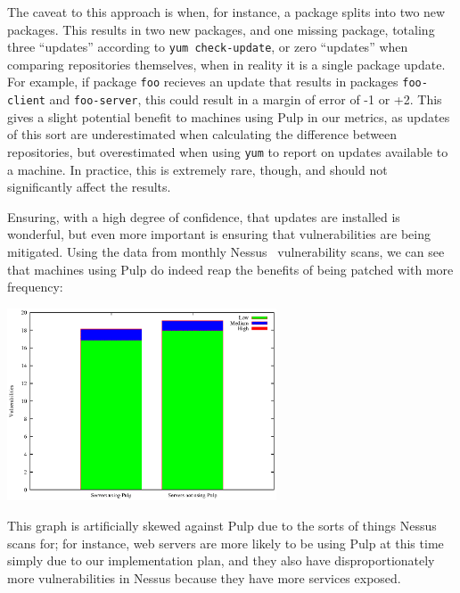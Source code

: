The caveat to this approach is when, for instance, a package splits
into two new packages. This results in two new packages, and one
missing package, totaling three ``updates'' according to \texttt{yum
  check-update}, or zero ``updates'' when comparing repositories
themselves, when in reality it is a single package update. For
example, if package \texttt{foo} recieves an update that results in
packages \texttt{foo-client} and \texttt{foo-server}, this could
result in a margin of error of -1 or +2.  This gives a slight
potential benefit to machines using Pulp in our metrics, as updates of
this sort are underestimated when calculating the difference between
repositories, but overestimated when using \texttt{yum} to report on
updates available to a machine.  In practice, this is extremely rare,
though, and should not significantly affect the results.

Ensuring, with a high degree of confidence, that updates are installed
is wonderful, but even more important is ensuring that vulnerabilities
are being mitigated.  Using the data from monthly Nessus~\cite{Ten11}
vulnerability scans, we can see that machines using Pulp do indeed
reap the benefits of being patched with more
frequency:

\begin{center}
\includegraphics[width=8cm]{vulns}
\end{center}

This graph is artificially skewed against Pulp due to the sorts of
things Nessus scans for; for instance, web servers are more likely to
be using Pulp at this time simply due to our implementation plan, and
they also have disproportionately more vulnerabilities in Nessus
because they have more services exposed.

